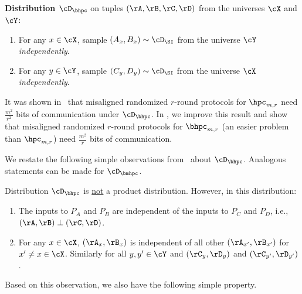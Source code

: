 \begin{tbox}
    \textbf{Distribution $\cD_\bhpc$} \cite{AssadiCK19} on tuples $(\rA,\rB,\rC,\rD)$ from the universes $\cX$ and $\cY$: 

    \begin{enumerate}
		\item For any $x \in \cX$, sample $(A_x,B_x) \sim \cD_\SI$ from the universe $\cY$ \emph{independently}. 
		\item For any $y \in \cY$, sample $(C_y,D_y) \sim \cD_\SI$ from the universe $\cX$ \emph{independently}. 
    \end{enumerate}
\end{tbox}

It was shown in~\cite{AssadiCK19} that misaligned randomized $r$-round protocols
for $\hpc_{m,r}$ need $\frac{m^2}{r^2}$ bits of communication under $\cD_\bhpc$.
In , we improve this result and show that
misaligned randomized $r$-round protocols for $\bhpc_{m,r}$ (an easier problem
than $\hpc_{m,r}$) need $\frac{m^2}{r}$ bits of communication.


We restate the following simple observations from~\cite{AssadiCK19} about
$\cD_\bhpc$.
Analogous statements can be made for $\cD_\bmhpc$.

\begin{observation}\label{obs:distHPC}
	Distribution $\cD_\bhpc$ is \underline{not} a product distribution. However, in this distribution: 
	\begin{enumerate}[label=(\roman*)]
		\item The inputs to $P_A$ and $P_B$ are {independent} of the inputs to
      $P_C$ and $P_D$, i.e., $(\rA,\rB) \perp (\rC,\rD)$. 
		\item For any $x \in \cX$, $(\rA_x,\rB_x)$ is independent of all other
      $(\rA_{x'},\rB_{x'})$ for $x'\neq x \in \cX$.
      Similarly for all $y,y' \in \cY$ and $(\rC_y,\rD_y)$ and $(\rC_{y'},\rD_{y'})$. 
	\end{enumerate}
\end{observation}

Based on this observation, we also have the following simple property. 

